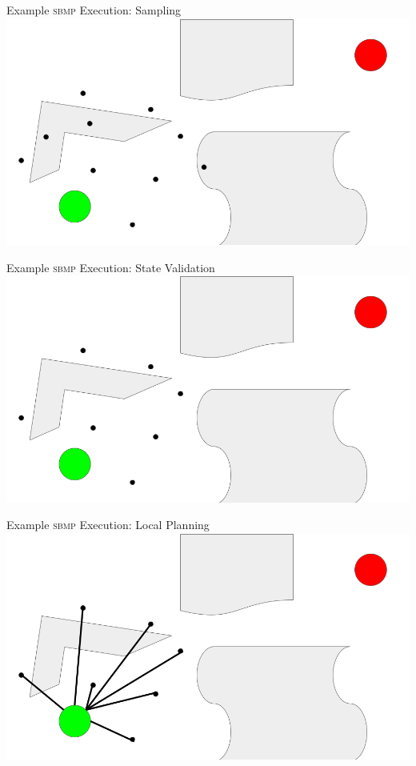 \documentclass{beamer}
\begin{document}
\begin{frame}{Example \textsc{sbmp} Execution: Sampling}
\includegraphics[width=\textwidth]{./assets/rrt_slides/rrt_slides_3.png}
\end{frame}

\begin{frame}{Example \textsc{sbmp} Execution: State Validation}
\includegraphics[width=\textwidth]{./assets/rrt_slides/rrt_slides_3.5.png}
\end{frame}

\begin{frame}{Example \textsc{sbmp} Execution: Local Planning}
\includegraphics[width=\textwidth]{./assets/rrt_slides/rrt_slides_4.png}
\end{frame}
\end{document}
